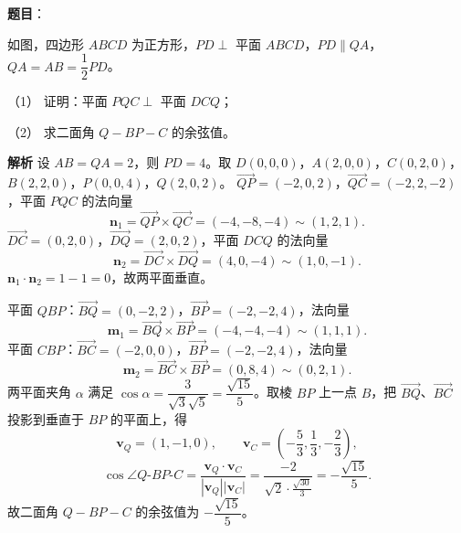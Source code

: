 \begin{answer}

\textbf{题目}：

如图，四边形 $ABCD$ 为正方形，$PD\perp$ 平面 $ABCD$，$PD\parallel QA$，$QA=AB=\dfrac12PD$。

（1） 证明：平面 $PQC\perp$ 平面 $DCQ$；

（2） 求二面角 $Q-BP-C$ 的余弦值。
\nopagebreak[4]
\begin{center}\end{center}
\nopagebreak[4]
\textbf{解析}
设 $AB=QA=2$，则 $PD=4$。取 $D(0,0,0)$，$A(2,0,0)$，$C(0,2,0)$，$B(2,2,0)$，$P(0,0,4)$，$Q(2,0,2)$。
$\overrightarrow{QP}=(-2,0,2)$，$\overrightarrow{QC}=(-2,2,-2)$，平面 $PQC$ 的法向量
\nopagebreak[4]
\[\boldsymbol n_1=\overrightarrow{QP}\times\overrightarrow{QC}=(-4,-8,-4)\sim(1,2,1).\]
$\overrightarrow{DC}=(0,2,0)$，$\overrightarrow{DQ}=(2,0,2)$，平面 $DCQ$ 的法向量
\nopagebreak[4]
\[\boldsymbol n_2=\overrightarrow{DC}\times\overrightarrow{DQ}=(4,0,-4)\sim(1,0,-1).\]
$\boldsymbol n_1\cdot\boldsymbol n_2=1-1=0$，故两平面垂直。

平面 $QBP$：$\overrightarrow{BQ}=(0,-2,2)$，$\overrightarrow{BP}=(-2,-2,4)$，法向量
\nopagebreak[4]
\[\boldsymbol m_1=\overrightarrow{BQ}\times\overrightarrow{BP}=(-4,-4,-4)\sim(1,1,1).\]
平面 $CBP$：$\overrightarrow{BC}=(-2,0,0)$，$\overrightarrow{BP}=(-2,-2,4)$，法向量
\nopagebreak[4]
\[\boldsymbol m_2=\overrightarrow{BC}\times\overrightarrow{BP}=(0,8,4)\sim(0,2,1).\]
两平面夹角 $\alpha$ 满足 $\cos\alpha=\dfrac{3}{\sqrt3\sqrt5}=\dfrac{\sqrt{15}}5$。取棱 $BP$ 上一点 $B$，把 $\overrightarrow{BQ}$、$\overrightarrow{BC}$ 投影到垂直于 $BP$ 的平面上，得
\nopagebreak[4]
\[\boldsymbol v_Q=(1,-1,0),\qquad \boldsymbol v_C=\left(-\frac53,\frac13,-\frac23\right),\]
\nopagebreak[4]
\[\cos\angle Q\text{-}BP\text{-}C=\frac{\boldsymbol v_Q\cdot\boldsymbol v_C}{|\boldsymbol v_Q||\boldsymbol v_C|}
=\frac{-2}{\sqrt2\cdot\frac{\sqrt{30}}3}=-\frac{\sqrt{15}}5.\]
故二面角 $Q-BP-C$ 的余弦值为 $-\dfrac{\sqrt{15}}5$。



\end{answer}
